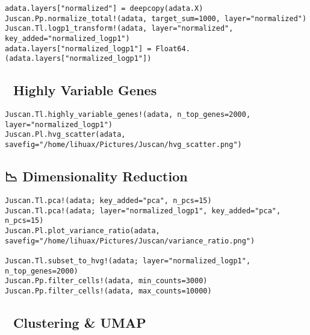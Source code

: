 \documentclass[oneside]{memoir}
\begin{document}
\label{12632274355541218568}{}



\begin{verbatim}
adata.layers["normalized"] = deepcopy(adata.X)
Juscan.Pp.normalize_total!(adata, target_sum=1000, layer="normalized")
Juscan.Tl.logp1_transform!(adata, layer="normalized", key_added="normalized_logp1")
adata.layers["normalized_logp1"] = Float64.(adata.layers["normalized_logp1"])
\end{verbatim}



\subsection{🧬 Highly Variable Genes}



\label{4519193584898427520}{}



\begin{verbatim}
Juscan.Tl.highly_variable_genes!(adata, n_top_genes=2000, layer="normalized_logp1")
Juscan.Pl.hvg_scatter(adata, savefig="/home/lihuax/Pictures/Juscan/hvg_scatter.png")
\end{verbatim}



\subsection{📉 Dimensionality Reduction}



\label{11472669785569077732}{}



\begin{verbatim}
Juscan.Tl.pca!(adata; key_added="pca", n_pcs=15)
Juscan.Tl.pca!(adata; layer="normalized_logp1", key_added="pca", n_pcs=15)
Juscan.Pl.plot_variance_ratio(adata, savefig="/home/lihuax/Pictures/Juscan/variance_ratio.png")

Juscan.Tl.subset_to_hvg!(adata; layer="normalized_logp1", n_top_genes=2000)
Juscan.Pp.filter_cells!(adata, min_counts=3000)
Juscan.Pp.filter_cells!(adata, max_counts=10000)
\end{verbatim}



\subsection{🔗 Clustering \& UMAP}
\end{document}
